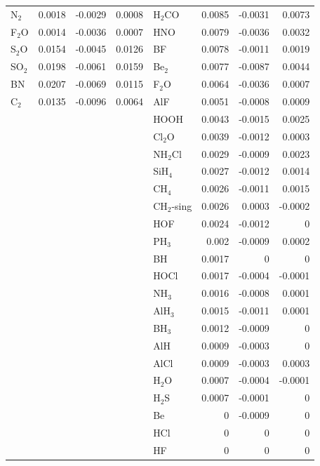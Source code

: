 \documentclass[11pt]{article}
\begin{document}
\begin{table}[htbp]
{\begin{tabular}{lrrr||lrrr}
N$_2$	&	0.0018	&	-0.0029	&	0.0008	&	H$_2$CO	&	0.0085	&	-0.0031	&	0.0073	\\
F$_2$O	&	0.0014	&	-0.0036	&	0.0007	&	HNO	&	0.0079	&	-0.0036	&	0.0032	\\
S$_2$O	&	0.0154	&	-0.0045	&	0.0126	&	BF	&	0.0078	&	-0.0011	&	0.0019	\\
SO$_2$	&	0.0198	&	-0.0061	&	0.0159	&	Be$_2$	&	0.0077	&	-0.0087	&	0.0044	\\
BN	&	0.0207	&	-0.0069	&	0.0115	&	F$_2$O	&	0.0064	&	-0.0036	&	0.0007	\\
C$_2$	&	0.0135	&	-0.0096	&	0.0064	&	AlF	&	0.0051	&	-0.0008	&	0.0009	\\
	&		&		&		&	HOOH	&	0.0043	&	-0.0015	&	0.0025	\\
	&		&		&		&	Cl$_2$O	&	0.0039	&	-0.0012	&	0.0003	\\
	&		&		&		&	NH$_2$Cl	&	0.0029	&	-0.0009	&	0.0023	\\
	&		&		&		&	SiH$_4$	&	0.0027	&	-0.0012	&	0.0014	\\
	&		&		&		&	CH$_4$	&	0.0026	&	-0.0011	&	0.0015	\\
	&		&		&		&	CH$_2$-sing	&	0.0026	&	0.0003	&	-0.0002	\\
	&		&		&		&	HOF	&	0.0024	&	-0.0012	&	0	\\
	&		&		&		&	PH$_3$	&	0.002	&	-0.0009	&	0.0002	\\
	&		&		&		&	BH	&	0.0017	&	0	&	0	\\
	&		&		&		&	HOCl	&	0.0017	&	-0.0004	&	-0.0001	\\
	&		&		&		&	NH$_3$	&	0.0016	&	-0.0008	&	0.0001	\\
	&		&		&		&	AlH$_3$	&	0.0015	&	-0.0011	&	0.0001	\\
	&		&		&		&	BH$_3$	&	0.0012	&	-0.0009	&	0	\\
	&		&		&		&	AlH	&	0.0009	&	-0.0003	&	0	\\
	&		&		&		&	AlCl	&	0.0009	&	-0.0003	&	0.0003	\\
	&		&		&		&	H$_2$O	&	0.0007	&	-0.0004	&	-0.0001	\\
	&		&		&		&	H$_2$S	&	0.0007	&	-0.0001	&	0	\\
	&		&		&		&	Be	&	0	&	-0.0009	&	0	\\
	&		&		&		&	HCl	&	0	&	0	&	0	\\
	&		&		&		&	HF	&	0	&	0	&	0	\\
\bottomrule
\end{tabular}
}
\end{table}
\end{document}

